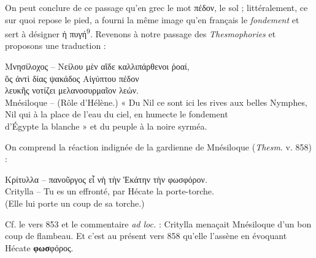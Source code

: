 \documentclass[12pt]{book}%
\newcommand{\italique}[1]{\textit{#1}}%
\newcommand{\citComm}[1]{\begin{quoting}[vskip=0pt] #1 \end{quoting}}%
\newcommand{\francais}[1]{{\policeFr #1}}%
\newcommand{\difference}[1]{\dotuline{#1}}
\newcommand{\marqueur}[1]{\textsuperscript{#1}}%
\newenvironment{groupe}{%
\pstart%
\ledgroup%
}{%
\pend %
}%
\begin{document}
\begin{pages}
\begin{Leftside}
\begin{groupe}
{{On peut conclure de ce passage qu'en grec le mot πέδον, le sol ; littéralement, ce sur quoi repose le pied, a fourni la même image qu'en français le \italique{fondement} et sert à désigner ἡ πυγή\marqueur{9}. 
Revenons à notre passage des \italique{Thesmophories} et proposons une traduction :%
\citComm{Μνησίλοχος – Νείλου μὲν αἵδε καλλιπάρθενοι ῥοαί,\\
ὃς ἀντὶ δίας ψακάδος Αἰγύπτου πέδον\\
λευκῆς νοτίζει μελανοσυρμαῖον λεών.\\
Mnésiloque – (Rôle d'Hélène.) « Du Nil ce sont ici les rives aux belles Nymphes,\\
Nil qui à la place de l'eau du ciel, en humecte le fondement\\
d'Égypte la blanche » et du peuple à la noire syrméa.}%
On comprend la réaction indignée de la gardienne de Mnésiloque (\italique{Thesm}. v. 858) :
\citComm{Κρίτυλλα – πανοῦργος εἶ νὴ τὴν Ἑκάτην τὴν φωσφόρον.\\
Critylla – Tu es un effronté, par Hécate la porte-torche.\\
(Elle lui porte un coup de sa torche.)}%
Cf. le vers 853 et le commentaire \italique{ad loc.} :
Critylla menaçait Mnésiloque d'un bon coup de flambeau. Et c'est au présent vers 858 qu'elle l'assène en évoquant Hécate \textbf{φωσ}φόρος.
}}
\end{groupe}
\end{Leftside}
\end{pages}
\end{document}
